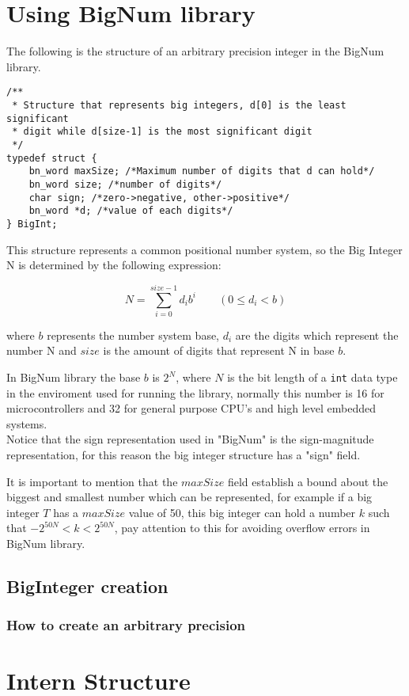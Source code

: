 \documentclass{book}
\begin{document}
\chapter{Using BigNum library}
The following is the structure of an arbitrary precision integer in the BigNum library.
\begin{verbatim}
/**
 * Structure that represents big integers, d[0] is the least significant
 * digit while d[size-1] is the most significant digit
 */
typedef struct {
    bn_word maxSize; /*Maximum number of digits that d can hold*/
    bn_word size; /*number of digits*/
    char sign; /*zero->negative, other->positive*/
    bn_word *d; /*value of each digits*/
} BigInt;
\end{verbatim}

This structure represents a common positional number system, so the Big Integer N is determined by the following expression:

\[N = \sum_{i=0}^{size-1}{d_i b^i} \quad\quad (0 \le d_i < b) \]

where $b$ represents the number system base, $d_i$  are the digits which represent the number N and $size$ is the amount of digits that represent N in base $b$.

In BigNum library the base $b$ is $2^N$, where $N$ is the bit length of a \verb+int+ data type in the enviroment used for running the library, normally this number is 16 for microcontrollers and 32 for general purpose CPU's and high level embedded systems.\\

Notice that the sign representation used in "BigNum" is the sign-magnitude representation, for this reason the big integer structure has a "sign" field.

It is important to mention that the $maxSize$ field establish a bound about the biggest and smallest number which can be represented, for example if a big integer $T$ has a $maxSize$ value of 50, this big integer can hold a number $k$ such that $-2^{50N}<k<2^{50N}$, pay attention to this for avoiding overflow errors in BigNum library.

\section{BigInteger creation}

\subsection{How to create an arbitrary precision }


\chapter{Intern Structure}
 
\end{document}
